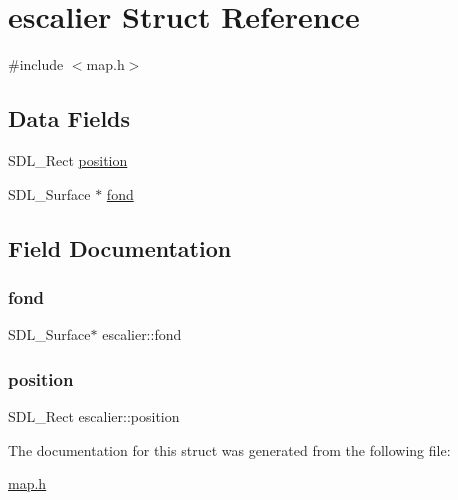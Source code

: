 \hypertarget{structescalier}{}\section{escalier Struct Reference}
\label{structescalier}


{\ttfamily \#include $<$map.\+h$>$}

\subsection*{Data Fields}
\begin{DoxyCompactItemize}
\item 
S\+D\+L\+\_\+\+Rect \hyperlink{structescalier_afe001a66e03ef6806fcd2e76e13fad4d}{position}
\item 
S\+D\+L\+\_\+\+Surface $\ast$ \hyperlink{structescalier_ab9698d9dc51214bcb04f4ba82d1059b3}{fond}
\end{DoxyCompactItemize}


\subsection{Field Documentation}
\mbox{\label{structescalier_ab9698d9dc51214bcb04f4ba82d1059b3}} 
\subsubsection{\texorpdfstring{fond}{fond}}
{\footnotesize\ttfamily S\+D\+L\+\_\+\+Surface$\ast$ escalier\+::fond}

\mbox{\label{structescalier_afe001a66e03ef6806fcd2e76e13fad4d}} 
\subsubsection{\texorpdfstring{position}{position}}
{\footnotesize\ttfamily S\+D\+L\+\_\+\+Rect escalier\+::position}



The documentation for this struct was generated from the following file\+:\begin{DoxyCompactItemize}
\item 
\hyperlink{map_8h}{map.\+h}\end{DoxyCompactItemize}
